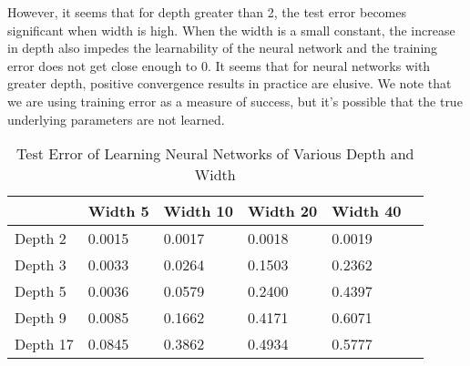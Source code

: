 However, it seems that for depth greater than 2, the test error becomes significant  when width is high. When the width is a small constant, the increase in depth also impedes the learnability of the neural network and the training error does not get close enough to 0. It seems that for neural networks with greater depth, positive convergence results in practice are elusive. We note that we are using training error as a measure of success, but it's possible that the true underlying parameters are not learned. 
\begin{table}[hb]
\caption{Test Error of Learning Neural Networks of Various Depth and Width}
\vskip 0.1in
\begin{center}
\begin{small}
\begin{sc}
\begin{tabular}{
  p{}|%
   |p{}%
  |p{}%
  |p{}%
  |p{}%
   |p{}%
  }
   \hline 
           & Width 5   &  Width 10   & Width 20 & Width 40     \\ \hline 
    Depth 2 & 0.0015   & 0.0017      &   0.0018 & 0.0019 \\ \hline
    Depth 3 & 0.0033   & 0.0264        &   0.1503 & 0.2362 \\ \hline
    Depth 5 & 0.0036   & 0.0579        &   0.2400 & 0.4397 \\ \hline
    Depth 9 & 0.0085   & 0.1662        &   0.4171 & 0.6071 \\ \hline
    Depth 17 & 0.0845   & 0.3862        &   0.4934 & 0.5777 \\ \hline
\end{tabular}
\end{sc}
\end{small}
\end{center}
\vskip -0.1in
\end{table}





